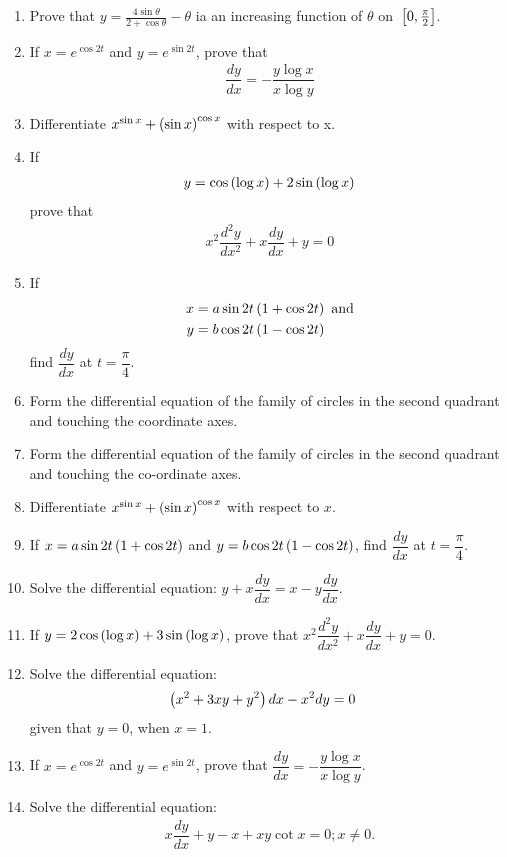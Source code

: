 \begin{enumerate}
	\item Prove that $ y = \frac{4\sin \theta}{2+ \cos \theta} - \theta$ ia an increasing function of $\theta$ on ${}\left[0,\frac{\pi}{2}\right]$.
\item If $x=e^{\cos 2t}$ and $y=e^{\sin 2t}$, prove that
          \begin{align*}
              \dfrac{dy}{dx}= -\dfrac{y \log x}{x \log y}
          \end{align*}
    \item Differentiate $x^{\sin x}+ \left(\sin x\right)^{\cos x}$ with respect to x.
    \item If
          \begin{align*}
              y=\cos \left(\log x\right) + 2 \sin \left(\log x\right)
          \end{align*}
          prove that
          \begin{align*}
              x^2 \dfrac{d^2 y}{dx^2} + x \dfrac{dy}{dx} +y =0
          \end{align*}
    \item If
          \begin{align*}
              x & =a\sin 2t\left(1+\cos 2t\right) \text{ and} \\
              y & =b\cos 2t\left(1-\cos 2t\right)
          \end{align*}
          find $\dfrac{dy}{dx}$ at $t=\dfrac{\pi}{4}$.
    \item Form the differential equation of the family of circles in the second quadrant and touching the coordinate axes.
\item Form the differential equation of the family of circles in the second quadrant and touching the co-ordinate axes.
\item Differentiate $x^{\sin{x}} + \left(\sin{x}\right)^{\cos{x}}$ with respect to $x$.
\item If $x = a\sin{2t}\left(1 + \cos{2t}\right)$ and $y = b\cos{2t}\left(1 - \cos{2t}\right)$, find $ \dfrac{dy}{dx}$ at $t = \dfrac{\pi}{4}$.
\item Solve the differential equation: $y + x\dfrac{dy}{dx} = x - y\dfrac{dy}{dx}$.
\item If $y = 2\cos{\ensuremath{\left(\log{x}\right)}} + 3\sin{\ensuremath{\left(\log{x}\right)}}$, prove that $x^2\dfrac{d^2y}{dx^2} + x\dfrac{dy}{dx} + y = 0$.
\item Solve the differential equation:
	\begin{align*}
		\left(x^2 +3xy + y^2\right)dx - x^2dy &= 0
	\end{align*}
given that $y=0$, when $x=1$.
\item If $x = e^{\cos{2t}}$ and $y = e^{\sin{2t}}$, prove that $ \dfrac{dy}{dx} = -\dfrac{y\log{x}}{x\log{y}}$.
\item Solve the differential equation:
	\begin{align*}
		x\dfrac{dy}{dx} + y - x + xy\cot{x} = 0; x \neq 0.
	\end{align*}
\end{enumerate}
